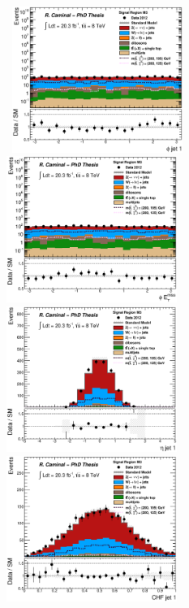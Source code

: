 \begin{figure}[!ht]
  \begin{center}
    \mbox{
      \includegraphics[width=0.495\textwidth]{MonojetAnalysis/Figures/plot_Stop_A4_SR_phi1_fitted.eps}
      \includegraphics[width=0.495\textwidth]{MonojetAnalysis/Figures/plot_Stop_A4_SR_met_phi_fitted.eps}
    }
    \mbox{
      \includegraphics[width=0.495\textwidth]{MonojetAnalysis/Figures/plot_Stop_A4_SR_eta1_fitted.eps}
      \includegraphics[width=0.495\textwidth]{MonojetAnalysis/Figures/plot_Stop_A4_SR_j1_chf_fitted.eps}
}
\end{center}
\end{figure}
